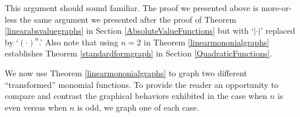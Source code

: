 \medskip

This argument should sound familiar.  The proof we presented above is more-or-less the same argument we presented after the proof of Theorem \ref{linearabsvaluegraphs} in Section \ref{AbsoluteValueFunctions} but with `$| \cdot |$' replaced by `$(\cdot)^n$.'  Also note that using $n =2$ in Theorem \ref{linearmononialgraphs} establishes Theorem \ref{standardformgraph} in Section \ref{QuadraticFunctions}. 

\medskip

We now use Theorem \ref{linearmononialgraphs} to graph two different ``transformed'' monomial functions. To provide the reader an opportunity to compare and contrast the graphical behaviors exhibited in the case when $n$ is even versus when $n$ is odd, we graph one of each case.

\medskip

